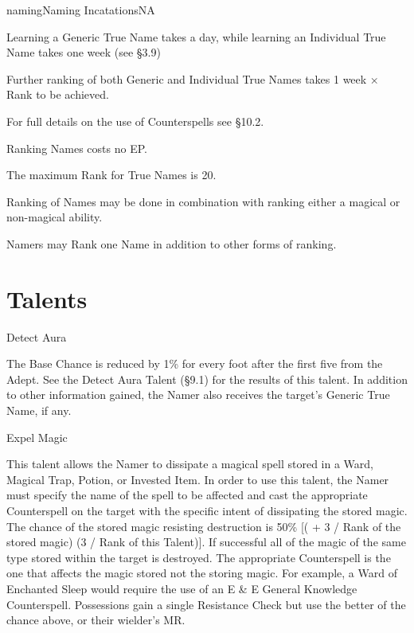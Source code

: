 \begin{College}[2.0]{naming}{Naming Incatations}{NA}
\begin{Itemize}
\item Learning a Generic True Name takes a day, while learning an
  Individual True Name takes one week (see §3.9)

\item Further ranking of both Generic and Individual True Names takes
  1 week × Rank to be achieved.
\end{Itemize}

For full details on the use of Counterspells see §10.2.

\begin{Itemize}
\item Ranking Names costs no EP.  
\item The maximum Rank for True Names is 20.  
\item Ranking of Names may be done in combination with ranking either
  a magical or non-magical ability.
\item Namers may Rank one Name in addition to other forms of ranking.
\end{Itemize}


\section{Talents}

\begin{talent}[T-1]{Detect Aura}

\begin{effects}
The Base Chance is reduced by 1\% for every foot after the first five
from the Adept.  See the Detect Aura Talent (§9.1) for the results of
this talent.  In addition to other information gained, the Namer also
receives the target’s Generic True Name, if any.
\end{effects}
\end{talent}

\begin{talent}[T-2]{Expel Magic}

\begin{effects}
This talent allows the Namer to dissipate a magical spell stored in a
Ward, Magical Trap, Potion, or Invested Item. In order to use this
talent, the Namer must specify the name of the spell to be affected
and cast the appropriate Counterspell on the target with the specific
intent of dissipating the stored magic.  The chance of the stored
magic resisting destruction is 50\% [( + 3 / Rank of the stored magic)
  (3 / Rank of this Talent)].  If successful all of the magic of the
same type stored within the target is destroyed.  The appropriate
Counterspell is the one that affects the magic stored not the storing
magic.  For example, a Ward of Enchanted Sleep would require the use
of an E \& E General Knowledge Counterspell. Possessions gain a single
Resistance Check but use the better of the chance above, or their
wielder’s MR.
\end{effects}
\end{talent}


\end{College}
